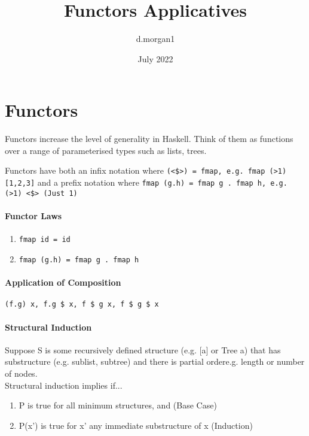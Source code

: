 \documentclass{article}
\title{Functors Applicatives}
\author{d.morgan1}
\date{July 2022}
\begin{document}
\maketitle

\section{Functors}
Functors increase the level of generality in Haskell. Think of them as functions over a range of parameterised types such as lists, trees. \newline

\noindent Functors have both an \textcolor{Mulberry}{infix notation} where \texttt{\textcolor{Emerald}{(<\$>) = fmap}, e.g. fmap (>1) [1,2,3]} and a \textcolor{Mulberry}{prefix notation} where \texttt{\textcolor{Emerald}{fmap (g.h) = fmap g . fmap h}, e.g. (>1) <\$> (Just 1)}

\paragraph{Functor Laws}
\begin{enumerate}
  \item \texttt{fmap id = id}
  \item \texttt{fmap (g.h) = fmap g . fmap h}
\end{enumerate}

\paragraph{Application of Composition}
\texttt{(f.g) x, f.g \$ x, f \$ g x, f \$ g \$ x}

\paragraph{Structural Induction}
Suppose S is some \textcolor{Mulberry}{recursively defined structure} (e.g. [a] or Tree a) that has \textcolor{Mulberry}{substructure} (e.g. sublist, subtree) and there is \textcolor{Mulberry}{partial order}{e.g. length or number of nodes}. 
\\
\textcolor{Mulberry}{Structural induction} implies if...
\begin{enumerate}
  \item P is true for \textcolor{Mulberry}{all minimum structures}, and     (Base Case)
  \item P(x') is true for x' any \textcolor{Mulberry}{immediate substructure} of x (Induction)
\end{enumerate}
\end{document}
